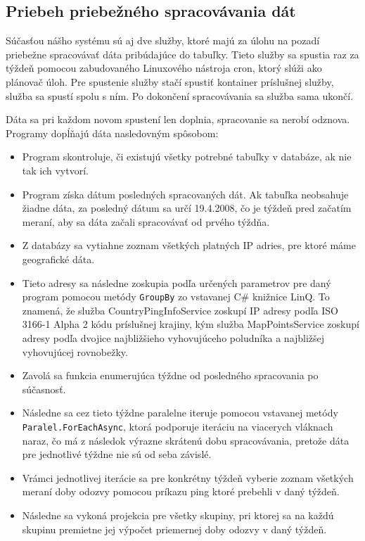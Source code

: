 \subsection{Priebeh priebežného spracovávania dát}
Súčasťou nášho systému sú aj dve služby, ktoré majú za úlohu na pozadí priebežne spracovávať dáta pribúdajúce do tabuľky. Tieto služby sa spustia raz za týždeň 
pomocou zabudovaného Linuxového nástroja cron, ktorý slúži ako plánovač úloh. Pre spustenie služby stačí spustiť kontainer príslušnej služby, služba sa spustí 
spolu s ním. Po dokončení spracovávania sa služba sama ukončí. 

Dáta sa pri každom novom spustení len doplnia, spracovanie sa nerobí odznova. Programy dopĺňajú dáta nasledovným spôsobom:
\begin{itemize}
    \item Program skontroluje, či existujú všetky potrebné tabuľky v databáze, ak nie tak ich vytvorí.
    \item Program získa dátum posledných spracovaných dát. Ak tabuľka neobsahuje žiadne dáta, za posledný dátum sa určí 19.4.2008, čo je týždeň pred začatím
    meraní, aby sa dáta začali spracovávať od prvého týždňa.
    \item Z databázy sa vytiahne zoznam všetkých platných IP adries, pre ktoré máme geografické dáta.
    \item Tieto adresy sa následne zoskupia podľa určených parametrov pre daný program pomocou metódy \lstinline{GroupBy} zo vstavanej C\# knižnice LinQ. To znamená,
    že služba CountryPingInfoService zoskupí IP adresy podľa ISO 3166-1 Alpha 2 kódu príslušnej krajiny, kým služba MapPointsService zoskupí adresy podľa 
    dvojice najbližšieho vyhovujúceho poludníka a najbližšej vyhovujúcej rovnobežky.
    \item Zavolá sa funkcia enumerujúca týždne od posledného spracovania po súčasnosť.
    \item Následne sa cez tieto týždne paralelne iteruje pomocou vstavanej metódy \lstinline{Paralel.ForEachAsync}, ktorá podporuje iteráciu na viacerych 
    vláknach naraz, čo má z následok výrazne skrátenú dobu spracovávania, pretože dáta pre jednotlivé týždne nie sú od seba závislé.
    \item Vrámci jednotlivej iterácie sa pre konkrétny týždeň vyberie zoznam všetkých meraní doby odozvy pomocou príkazu ping ktoré prebehli v daný týždeň. 
    \item Následne sa vykoná projekcia pre všetky skupiny, pri ktorej sa na každú skupinu premietne jej výpočet priemernej doby odozvy v daný týždeň.

\end{itemize}
